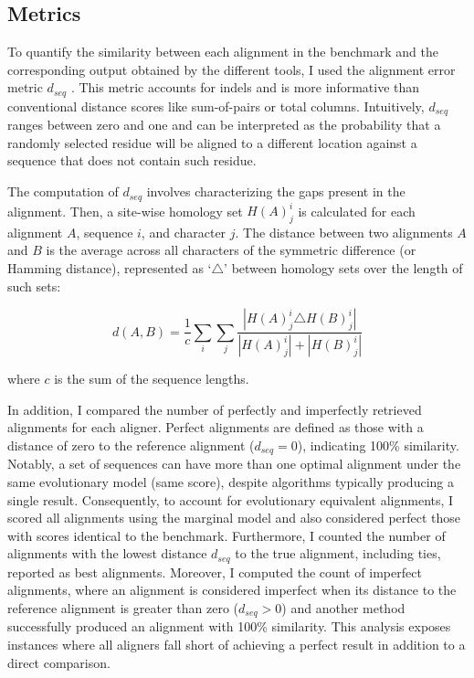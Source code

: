 \documentclass[12pt,letterpaper]{article}
\begin{document}
\subsection*{Metrics}

To quantify the similarity between each alignment in the benchmark and the corresponding output obtained by the different tools, I used the alignment error metric $d_{seq}$ \citep{metrics_blackburne_whelan_2011}. This metric accounts for indels and is more informative than conventional distance scores like sum-of-pairs or total columns. Intuitively, $d_{seq}$ ranges between zero and one and can be interpreted as the probability that a randomly selected residue will be aligned to a different location against a sequence that does not contain such residue.

The computation of $d_{seq}$ involves characterizing the gaps present in the alignment. Then, a site-wise homology set $H(A)^i_j$ is calculated for each alignment $A$, sequence $i$, and character $j$. The distance between two alignments $A$ and $B$ is the average across all characters of the symmetric difference (or Hamming distance), represented as `$\triangle$' between homology sets over the length of such sets:

\begin{equation}
d(A,B) = \frac{1}{c} \sum_i \sum_j \frac{|H(A)^i_j \triangle H(B)^i_j|}{|H(A)^i_j|+|H(B)^i_j|}
\end{equation}

\noindent where $c$ is the sum of the sequence lengths.

In addition, I compared the number of perfectly and imperfectly retrieved alignments for each aligner. Perfect alignments are defined as those with a distance of zero to the reference alignment ($d_{seq} = 0$), indicating 100\% similarity. Notably, a set of sequences can have more than one optimal alignment under the same evolutionary model (same score), despite algorithms typically producing a single result. Consequently, to account for evolutionary equivalent alignments, I scored all alignments using the marginal model and also considered perfect those with scores identical to the benchmark.
Furthermore, I counted the number of alignments with the lowest distance $d_{seq}$ to the true alignment, including ties, reported as best alignments. Moreover, I computed the count of imperfect alignments, where an alignment is considered imperfect when its distance to the reference alignment is greater than zero ($d_{seq} > 0$) and another method successfully produced an alignment with 100\% similarity. This analysis exposes instances where all aligners fall short of achieving a perfect result in addition to a direct comparison.
\end{document}
